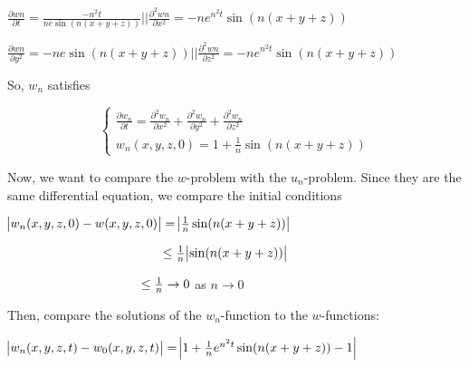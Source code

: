 \documentclass[executivepaper]{article}
\begin{document}
\begin{flushleft}
\begin{center}

$\frac{\partial w n}{\partial t}=\frac{-n^2 t}{n e \sin(n(x+y+z))} \rvert \rvert \frac{\partial ^2 w n}{\partial x^2}=-ne^{n^{2}t} \sin(n(x+y+z))$

\vspace{2mm}

$\frac{\partial w n}{\partial y^2}=-n e \sin(n(x+y+z)) \rvert \rvert \frac{\partial ^2 w n}{\partial z^2}=-ne^{n^{2}t} \sin(n(x+y+z))$

\end{center}

So, $w_{n}$ satisfies

\begin{center}

\[ \begin{cases} 
      \frac{\partial w_{n}}{\partial t}=\frac{\partial^2 w_{n}}{\partial x^2}+\frac{\partial^2 w_{n}}{\partial y^2} + \frac{\partial^2 w_{n}}{\partial z^2} \\
      w_{n}(x,y,z,0)=1 + \frac{1}{n} \sin(n(x+y+z))
   \end{cases}
\]

\end{center}

Now, we want to compare the $w$-problem with the $u_{n}$-problem. Since they are the same differential equation, we compare the initial conditions

\begin{center}

$\abs{w_{n}(x,y,z,0)-w(x,y,z,0)}=\abs{\frac{1}{n} \sin(n(x+y+z))}$

\vspace{2mm}

$\hspace*{43mm} \leq \frac{1}{n} \abs{\sin(n(x+y+z))}$

\vspace{2mm}

$\hspace*{37mm} \leq \frac{1}{n} \rightarrow 0$ as $n \rightarrow 0$

\end{center}

Then, compare the solutions of the $w_{n}$-function to the $w$-functions:

\begin{center}

$\abs{w_{n}(x,y,z,t)-w_{0}(x,y,z,t)}=\abs{1 + \frac{1}{n} e^{n^{2} t} \sin(n(x+y+z))-1}$


\end{center}
\end{flushleft}
\end{document}
